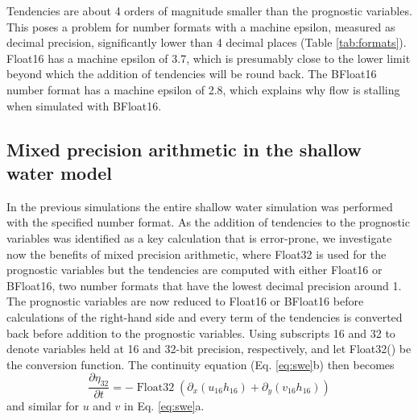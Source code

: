 \documentclass[draft]{agujournal2019}
\newcommand{\op}{\operatorname}
\begin{document}
Tendencies are about 4 orders of magnitude smaller than the prognostic variables.
This poses a problem for number formats with a machine epsilon, measured as decimal
precision, significantly lower than 4 decimal places (Table \ref{tab:formats}).
Float16 has a machine epsilon of 3.7, which is presumably close to the lower limit
beyond which the addition of tendencies will be round back. The BFloat16 number
format has a machine epsilon of 2.8, which explains why flow is stalling when
simulated with BFloat16.

\subsection{Mixed precision arithmetic in the shallow water model}
\label{sec:mixed}

In the previous simulations the entire shallow water simulation was performed
with the specified number format. As the addition of tendencies to the prognostic
variables was identified as a key calculation that is error-prone, we investigate
now the benefits of mixed precision arithmetic, where Float32 is used for the
prognostic variables but the tendencies are computed with either Float16 or
BFloat16, two number formats that have the lowest decimal precision around 1.
The prognostic variables are now reduced to Float16 or BFloat16 before calculations
of the right-hand side and every term of the tendencies is converted back before
addition to the prognostic variables. Using subscripts 16 and 32 to denote variables
held at 16 and 32-bit precision, respectively, and let Float32() be the conversion
function. The continuity equation (Eq. \ref{eq:swe}b) then becomes
\begin{equation}
\frac{\partial \eta_{32}}{\partial t} = -\op{Float32}( \partial_x(u_{16}h_{16})
+ \partial_y(v_{16}h_{16} ))
\label{eq:conversion}
\end{equation}
and similar for $u$ and $v$ in Eq. \ref{eq:swe}a.
\end{document}
